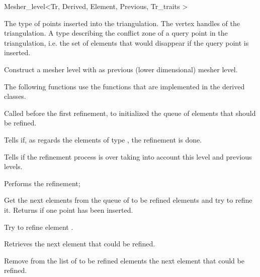 \begin{ccRefClass}{Mesher_level<Tr, Derived, Element, Previous,
Tr_traits >}


\ccTypes
{}
{The type of points inserted into the triangulation.}
\ccGlue
{}
{ The vertex handles of the triangulation.}
\ccGlue
{}
{A type describing the conflict zone of a query point in the triangulation,
i.e. the set of elements that would disappear if the query point is inserted.}



\ccCreation
{}  %

{Construct a mesher level with  as previous 
(lower dimensional) mesher level.}



The following functions use the functions that are implemented in 
the derived classes.

	{ Called before the first refinement, to initialized the queue of
      	elements that should be refined.}

        { Tells if, as regards the elements of type , 
          the refinement is  done.}

{Tells if the refinement process is over
taking into account this level and previous levels.}
 

{ Performs the refinement;}

{ Get the next elements from the queue of to be refined elements
and try to refine it. Returns  if one point has been inserted.}
 
 {Try to refine element .}


{ Retrieves the next element that could be refined.}
  
{Remove from the list of to be refined elements
the next element that could be refined.}



\end{ccRefClass}
